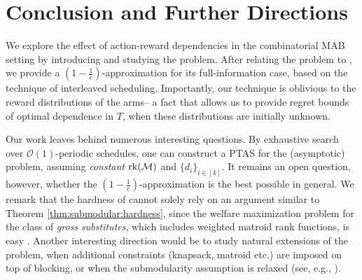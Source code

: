 \section*{Conclusion and Further Directions}
We explore the effect of action-reward dependencies in the combinatorial MAB setting by introducing and studying the \mbb problem. After relating the problem to \rsm, we provide a $\left(1-\frac{1}{e}\right)$-approximation for its full-information case, based on the technique of interleaved scheduling. Importantly, our technique is oblivious to the reward distributions of the arms-- a fact that allows us to provide regret bounds of optimal dependence in $T$, when these distributions are initially unknown. 


Our work leaves behind numerous interesting questions. By exhaustive search over $\mathcal{O}(1)$-periodic schedules, one can construct a PTAS for the (asymptotic) \mbb problem, assuming {\em constant} $\operatorname{rk}(\operatorname{\mathcal{M}})$ and $\{d_i\}_{i \in [k]}$. It remains an open question, however, whether the $\left(1-\frac{1}{e}\right)$-approximation is the best possible in general. We remark that the hardness of \mbb cannot solely rely on an argument similar to Theorem \ref{thm:submodular:hardness}, since the welfare maximization problem for the class of {\em gross substitutes}, which includes weighted matroid rank functions, is easy \cite{Leme17}. Another interesting direction would be to study natural extensions of the \rsm problem, when additional constraints (knapsack, matroid etc.) are imposed on top of blocking, or when the submodularity assumption is relaxed (see, e.g., \cite{Feige06}).

